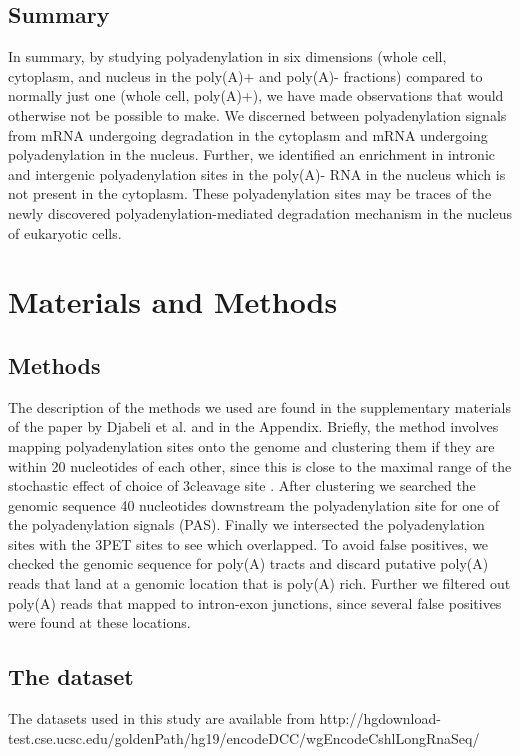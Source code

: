 \subsection{Summary}
In summary, by studying polyadenylation in six dimensions (whole cell,
cytoplasm, and nucleus in the poly(A)+ and poly(A)- fractions) compared to
normally just one (whole cell, poly(A)+), we have made observations that would
otherwise not be possible to make. We discerned between polyadenylation signals
from mRNA undergoing degradation in the cytoplasm and mRNA undergoing
polyadenylation in the nucleus. Further, we identified an enrichment in
intronic and intergenic polyadenylation sites in the poly(A)- RNA in the
nucleus which is not present in the cytoplasm. These polyadenylation sites may
be traces of the newly discovered polyadenylation-mediated degradation
mechanism in the nucleus of eukaryotic cells.

\section{Materials and Methods}
\subsection{Methods}
The description of the methods we used are found in the supplementary materials
of the paper by Djabeli et al. and in the Appendix. Briefly, the method
involves mapping polyadenylation sites onto the genome and clustering them if
they are within 20 nucleotides of each other, since this is close to the
maximal range of the stochastic effect of choice of 3\p cleavage site
\cite{tian_large-scale_2005}. After clustering we searched the genomic sequence
40 nucleotides downstream the polyadenylation site for one of the
polyadenylation signals (PAS). Finally we intersected the polyadenylation sites
with the 3\p PET sites to see which overlapped. To avoid false positives, we
checked the genomic sequence for poly(A) tracts and discard putative poly(A)
reads that land at a genomic location that is poly(A) rich. Further we filtered
out poly(A) reads that mapped to intron-exon junctions, since several false
positives were found at these locations.

\subsection{The dataset}
The datasets used in this study are available from
http://hgdownload-test.cse.ucsc.edu/goldenPath/hg19/encodeDCC/wgEncodeCshlLongRnaSeq/

